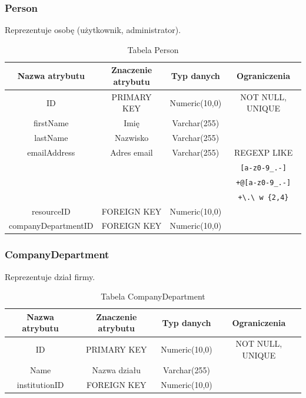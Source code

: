 \subsubsection{Person}
Reprezentuje osobę (użytkownik, administrator).
\begin{table}[H]
	\renewcommand\arraystretch{1.5}
	\renewcommand\tabcolsep{3pt}
\begin{tabular}{| c | c | c | c |}
	\hline \textbf{Nazwa atrybutu} & \textbf{Znaczenie atrybutu} & \textbf{Typ danych} & \textbf{Ograniczenia} \\ 
	\hline ID & PRIMARY KEY & Numeric(10,0) & NOT NULL, UNIQUE \\ 
	\hline firstName & Imię & Varchar(255) & \\ 
	\hline lastName & Nazwisko & Varchar(255) &  \\ 
	\hline emailAddress & Adres email & Varchar(255) & REGEXP LIKE\\
	~ & ~ & ~ & \verb|[a-z0-9_.-]|\\ 
	~ & ~ & ~ & \verb|+@[a-z0-9_.-]|\\ 
	~ & ~ & ~ & \verb|+\.\ w {2,4}|\\ 
	\hline resourceID & FOREIGN KEY & Numeric(10,0) & \\ 
	\hline companyDepartmentID & FOREIGN KEY & Numeric(10,0) & \\ 
	\hline 
\end{tabular} 
\caption{Tabela Person}
\label{TAB:Person}
\end{table}

\subsubsection{CompanyDepartment}
Reprezentuje dział firmy.
\begin{table}[H]
	\renewcommand\arraystretch{1.5}
	\renewcommand\tabcolsep{3pt}
	\begin{tabular}{| c | c | c | c |} 
		\hline \textbf{Nazwa atrybutu} & \textbf{Znaczenie atrybutu} & \textbf{Typ danych} & \textbf{Ograniczenia} \\ 
		\hline ID & PRIMARY KEY & Numeric(10,0) & NOT NULL, UNIQUE \\ 
		\hline Name & Nazwa działu & Varchar(255) &  \\ 
		\hline institutionID & FOREIGN KEY & Numeric(10,0) & \\ 
		\hline 
	\end{tabular} 
	\caption{Tabela CompanyDepartment}
	\label{TAB:CompanyDepartment}
\end{table}


